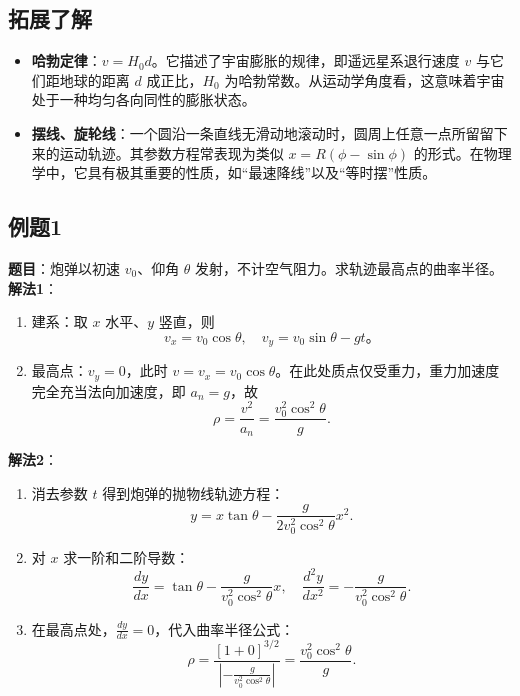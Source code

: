 \subsection{拓展了解}
\begin{itemize}
    \item \textbf{哈勃定律}：$v = H_0 d$。它描述了宇宙膨胀的规律，即遥远星系退行速度 $v$ 与它们距地球的距离 $d$ 成正比，$H_0$ 为哈勃常数。从运动学角度看，这意味着宇宙处于一种均匀各向同性的膨胀状态。
    \item \textbf{摆线、旋轮线}：一个圆沿一条直线无滑动地滚动时，圆周上任意一点所留留下来的运动轨迹。其参数方程常表现为类似 $x = R(\phi - \sin\phi)$ 的形式。在物理学中，它具有极其重要的性质，如“最速降线”以及“等时摆”性质。
\end{itemize}

\subsection{例题1}
\textbf{题目}：炮弹以初速 $v_0$、仰角 $\theta$ 发射，不计空气阻力。求轨迹最高点的曲率半径。\\

\textbf{解法1}：
\begin{enumerate}
    \item 建系：取 $x$ 水平、$y$ 竖直，则
          \[
              v_x = v_0\cos\theta,\quad v_y = v_0\sin\theta - gt。
          \]
    \item 最高点：$v_y = 0$，此时 $v = v_x = v_0\cos\theta$。在此处质点仅受重力，重力加速度完全充当法向加速度，即 $a_n = g$，故
          \[
              \rho = \frac{v^2}{a_n} = \frac{v_0^2\cos^2\theta}{g}.
          \]
\end{enumerate}

\textbf{解法2}：
\begin{enumerate}
    \item 消去参数 $t$ 得到炮弹的抛物线轨迹方程：
          \[
              y = x\tan\theta - \frac{g}{2v_0^2\cos^2\theta}x^2.
          \]
    \item 对 $x$ 求一阶和二阶导数：
          \[
              \frac{dy}{dx} = \tan\theta - \frac{g}{v_0^2\cos^2\theta}x,\quad \frac{d^2y}{dx^2} = -\frac{g}{v_0^2\cos^2\theta}.
          \]
    \item 在最高点处，$\frac{dy}{dx} = 0$，代入曲率半径公式：
          \[
              \rho = \frac{[1 + 0]^{3/2}}{\left|-\frac{g}{v_0^2\cos^2\theta}\right|} = \frac{v_0^2\cos^2\theta}{g}.
          \]
\end{enumerate}

